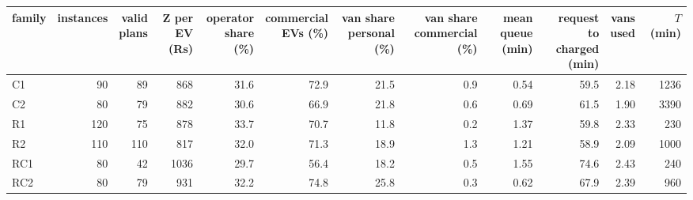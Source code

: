 \begin{tabular}{lrrrrrrrrrrr}\toprule
family & instances & \shortstack{valid\\plans} & \shortstack{Z per EV\\(Rs)} & \shortstack{operator\\share (\%)} & \shortstack{commercial\\EVs (\%)} & \shortstack{van share\\personal (\%)} & \shortstack{van share\\commercial (\%)} & \shortstack{mean queue\\(min)} & \shortstack{request to\\charged (min)} & \shortstack{vans\\used} & $T$ (min) \\ \midrule
C1 & 90 & 89 & 868 & 31.6 & 72.9 & 21.5 & 0.9 & 0.54 & 59.5 & 2.18 & 1236 \\
C2 & 80 & 79 & 882 & 30.6 & 66.9 & 21.8 & 0.6 & 0.69 & 61.5 & 1.90 & 3390 \\
R1 & 120 & 75 & 878 & 33.7 & 70.7 & 11.8 & 0.2 & 1.37 & 59.8 & 2.33 & 230 \\
R2 & 110 & 110 & 817 & 32.0 & 71.3 & 18.9 & 1.3 & 1.21 & 58.9 & 2.09 & 1000 \\
RC1 & 80 & 42 & 1036 & 29.7 & 56.4 & 18.2 & 0.5 & 1.55 & 74.6 & 2.43 & 240 \\
RC2 & 80 & 79 & 931 & 32.2 & 74.8 & 25.8 & 0.3 & 0.62 & 67.9 & 2.39 & 960 \\
\bottomrule\end{tabular}

